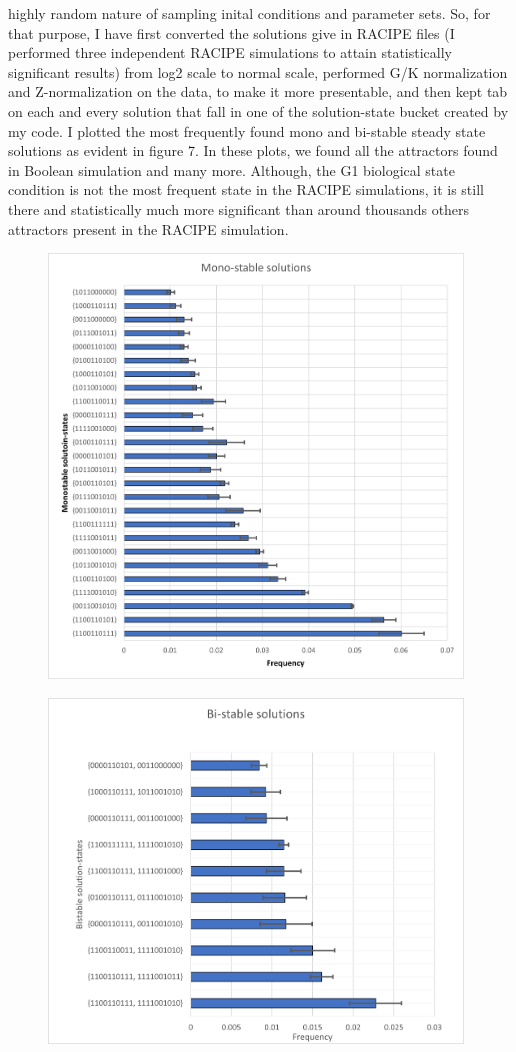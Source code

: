 \documentclass{article}
\begin{document}
highly random nature of sampling inital conditions and parameter sets. So, for 
that purpose, I have first converted the solutions give in RACIPE files 
(I performed three independent RACIPE simulations to attain statistically 
significant results) from 
log2 scale to normal scale, performed G/K normalization and Z-normalization on 
the data, to make it more presentable, and then kept tab on each and every solution
that fall in one of the solution-state bucket created by my code. I plotted 
the most frequently found mono and bi-stable steady state solutions as evident 
in figure 7. In these plots, we found all the attractors found in Boolean simulation
and many more. Although, the G1 biological state condition is not the most frequent 
state in the RACIPE simulations, it is still there and statistically much more significant 
than around thousands others attractors present in the RACIPE simulation.
\begin{figure}[H]
  \centering
  \includegraphics[width=110mm, scale=0.5]{monostable-freq.png}
\end{figure}
\begin{figure}[H]
  \centering
  \includegraphics[width=110mm, scale=0.5]{bistable-freq.png}
   \\
\end{figure}
\end{document}
